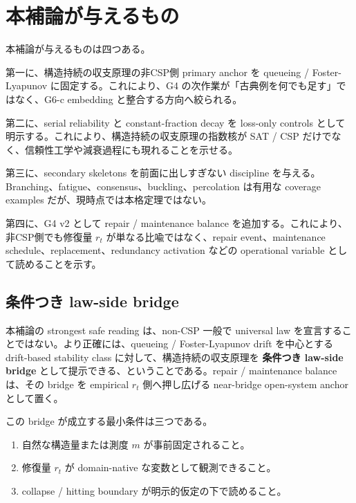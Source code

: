 \documentclass[12pt,a4paper]{article}
\begin{document}
\section{本補論が与えるもの}\label{ux672cux88dcux8ad6ux304cux4e0eux3048ux308bux3082ux306e}

本補論が与えるものは四つある。

第一に、構造持続の収支原理の非CSP側 primary anchor を queueing / Foster-Lyapunov に固定する。これにより、G4 の次作業が「古典例を何でも足す」ではなく、G6-c embedding と整合する方向へ絞られる。

第二に、serial reliability と constant-fraction decay を loss-only controls として明示する。これにより、構造持続の収支原理の指数核が SAT / CSP だけでなく、信頼性工学や減衰過程にも現れることを示せる。

第三に、secondary skeletons を前面に出しすぎない discipline を与える。Branching、fatigue、consensus、buckling、percolation は有用な coverage examples だが、現時点では本格定理ではない。

第四に、G4 v2 として repair / maintenance balance を追加する。これにより、非CSP側でも修復量 \(r_{t}\) が単なる比喩ではなく、repair event、maintenance schedule、replacement、redundancy activation などの operational variable として読めることを示す。

\subsection{条件つき law-side bridge}\label{ux6761ux4ef6ux3064ux304d-law-side-bridge}

本補論の strongest safe reading は、non-CSP 一般で universal law を宣言することではない。より正確には、queueing / Foster-Lyapunov drift を中心とする drift-based stability class に対して、構造持続の収支原理を \textbf{条件つき law-side bridge} として提示できる、ということである。repair / maintenance balance は、その bridge を empirical \(r_{t}\) 側へ押し広げる near-bridge open-system anchor として置く。

この bridge が成立する最小条件は三つである。

\begin{enumerate}
\def\labelenumi{\arabic{enumi}.}
\tightlist
\item
  自然な構造量または測度 \(m\) が事前固定されること。
\item
  修復量 \(r_{t}\) が domain-native な変数として観測できること。
\item
  collapse / hitting boundary が明示的仮定の下で読めること。
\end{enumerate}
\end{document}

